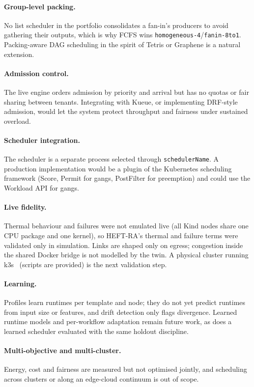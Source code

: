 \documentclass[12pt,a4paper]{report}
\begin{document}
\paragraph{Group-level packing.} No list scheduler in the portfolio
consolidates a fan-in's producers to avoid gathering their outputs, which
is why FCFS wins \texttt{homogeneous-4}/\texttt{fanin-8to1}. Packing-aware
DAG scheduling in the spirit of Tetris or Graphene is a natural extension.

\paragraph{Admission control.} The live engine orders admission by
priority and arrival but has no quotas or fair sharing between tenants.
Integrating with Kueue, or implementing DRF-style admission, would let the
system protect throughput and fairness under sustained overload.

\paragraph{Scheduler integration.} The scheduler is a separate process
selected through \texttt{schedulerName}. A production implementation
would be a plugin of the Kubernetes scheduling framework (Score, Permit for
gangs, PostFilter for preemption) and could use the Workload API for
gangs.

\paragraph{Live fidelity.} Thermal behaviour and failures were not
emulated live (all Kind nodes share one CPU package and one kernel), so
HEFT-RA's thermal and failure terms were validated only in simulation.
Links are shaped only on egress; congestion inside the shared Docker
bridge is not modelled by the twin. A physical cluster running
k3s~\cite{k3s} (scripts are provided) is the next validation step.

\paragraph{Learning.} Profiles learn runtimes per template and node; they
do not yet predict runtimes from input size or features, and drift
detection only flags divergence. Learned runtime models and per-workflow
adaptation remain future work, as does a learned scheduler evaluated with
the same holdout discipline.

\paragraph{Multi-objective and multi-cluster.} Energy, cost and fairness
are measured but not optimised jointly, and scheduling across clusters or
along an edge-cloud continuum is out of scope.
\end{document}
